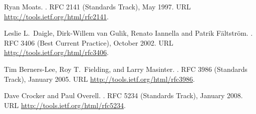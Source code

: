 \documentclass[12pt]{article}  %
\begin{document}
\begin{thebibliography}{2}
Ryan Moats.
.
\newblock RFC 2141 (Standards Track), May 1997.
\newblock URL \url{http://tools.ietf.org/html/rfc2141}.




Leslie L.\ Daigle, Dirk-Willem van Gulik, Renato Iannella and Patrik Fältström.
.
\newblock RFC 3406 (Best Current Practice), October 2002.
\newblock URL \url{http://tools.ietf.org/html/rfc3406}.

Tim Berners-Lee, Roy T.\ Fielding, and Larry Masinter.
.
\newblock RFC 3986 (Standards Track), January 2005.
\newblock URL \url{http://tools.ietf.org/html/rfc3986}.



Dave Crocker and Paul Overell.
.
\newblock RFC 5234 (Standards Track), January 2008.
\newblock URL \url{http://tools.ietf.org/html/rfc5234}.


\end{thebibliography}
\end{document}
